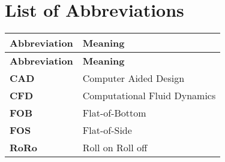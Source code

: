 \chapter*{List of Abbreviations}

\begin{longtable}[c]{>{\bfseries}p{3cm} p{11.9cm}}
	Abbreviation & \textbf{Meaning} \\[3ex]
	\endfirsthead
	Abbreviation & \textbf{Meaning} \\[3ex]
	\endhead
	CAD&Computer Aided Design \\[2mm]
	CFD&Computational Fluid Dynamics\\[2mm]
	FOB&Flat-of-Bottom\\[2mm]
	FOS&Flat-of-Side\\[2mm]
	RoRo&Roll on Roll off\\[2mm]
\end{longtable}